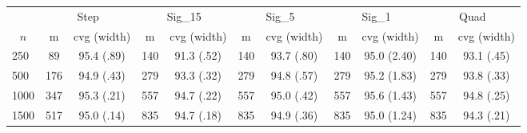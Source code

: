 \documentclass{article}
\begin{document}
\begin{tabular}{lcccccccccc}
   \toprule
 
           & \multicolumn{2}{c}{Step}& \multicolumn{2}{c}{Sig\_15}& \multicolumn{2}{c}{Sig\_5}& \multicolumn{2}{c}{Sig\_1}& \multicolumn{2}{c}{Quad} \\ 
             \cmidrule(l{2pt}r{2pt}){2-3} \cmidrule(l{2pt}r{2pt}){4-5} \cmidrule(l{2pt}r{2pt}){6-7} \cmidrule(l{2pt}r{2pt}){8-9}  \cmidrule(l{2pt}r{2pt}){10-11} 
             \multicolumn{1}{c}{$n$} & \multicolumn{1}{c}{m}& \multicolumn{1}{c}{cvg (width)}& \multicolumn{1}{c}{m}& \multicolumn{1}{c}{cvg (width)}& \multicolumn{1}{c}{m}& \multicolumn{1}{c}{cvg (width)}& \multicolumn{1}{c}{m}& \multicolumn{1}{c}{cvg (width)}& \multicolumn{1}{c}{m}& \multicolumn{1}{c}{cvg (width)} \\ \midrule 
        250 & 89 & 95.4 (.89) & 140 & 91.3 (.52) & 140 & 93.7 (.80) & 140 & 95.0 (2.40) & 140 & 93.1 (.45) \\ 
  500 & 176 & 94.9 (.43) & 279 & 93.3 (.32) & 279 & 94.8 (.57) & 279 & 95.2 (1.83) & 279 & 93.8 (.33) \\ 
  1000 & 347 & 95.3 (.21) & 557 & 94.7 (.22) & 557 & 95.0 (.42) & 557 & 95.6 (1.43) & 557 & 94.8 (.25) \\ 
  1500 & 517 & 95.0 (.14) & 835 & 94.7 (.18) & 835 & 94.9 (.36) & 835 & 95.0 (1.24) & 835 & 94.3 (.21) \\ 
   \hline
\end{tabular}
\end{document}
